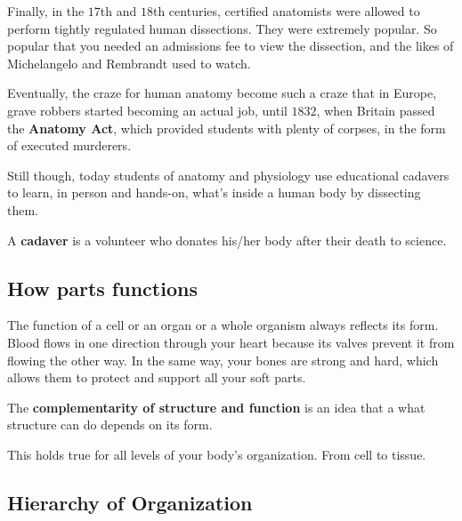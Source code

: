 Finally, in the $17$th and $18$th centuries, certified anatomists were allowed
to perform tightly regulated human dissections. They were extremely popular. So
popular that you needed an admissions fee to view the dissection, and the likes
of Michelangelo and Rembrandt used to watch.

Eventually, the craze for human anatomy become such a craze that in Europe,
grave robbers started becoming an actual job, until $1832$, when Britain passed
the \textbf{Anatomy Act}, which provided students with plenty of corpses, in
the form of executed murderers.

Still though, today students of anatomy and physiology use educational cadavers
to learn, in person and hands-on, what's inside a human body by dissecting
them.

\begin{definition}[Cadaver]
	\label{def:cadaver}

	A \textbf{cadaver} is a volunteer who donates his/her body after their death
	to science.
\end{definition}


\subsection*{How parts functions}
\label{sub_sec:how_parts_functions}

The function of a cell or an organ or a whole organism always reflects its
form. Blood flows in one direction through your heart because its valves
prevent it from flowing the other way. In the same way, your bones are strong
and hard, which allows them to protect and support all your soft parts.

\begin{definition}
	\label{def:complementarity_of_structure_and_function}

	The \textbf{complementarity of structure and function} is an idea that a what
	structure can do depends on its form.
\end{definition}

This holds true for all levels of your body's organization. From cell to
tissue.


\subsection*{Hierarchy of Organization}
\label{sub_sec:hierarchy_of_organization}

